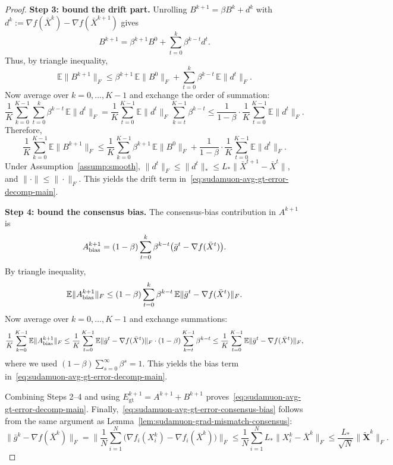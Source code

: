 \documentclass{article}
\begin{document}
\begin{proof}
\medskip\noindent\textbf{Step 3: bound the drift part.}
Unrolling $B^{k+1}=\beta B^k+d^k$ with $d^k:=\nabla f(\bar X^k)-\nabla f(\bar X^{k+1})$ gives
\[
B^{k+1}=\beta^{k+1}B^0+\sum_{t=0}^{k}\beta^{k-t}d^t.
\]
Thus, by triangle inequality,
\[
\mathbb{E}\|B^{k+1}\|_F
\le \beta^{k+1}\,\mathbb{E}\|B^0\|_F
+\sum_{t=0}^{k}\beta^{k-t}\,\mathbb{E}\|d^t\|_F.
\]
Now average over $k=0,\dots,K-1$ and exchange the order of summation:
\[
\frac{1}{K}\sum_{k=0}^{K-1}\sum_{t=0}^{k}\beta^{k-t}\,\mathbb{E}\|d^t\|_F
=\frac{1}{K}\sum_{t=0}^{K-1}\mathbb{E}\|d^t\|_F\sum_{k=t}^{K-1}\beta^{k-t}
\le \frac{1}{1-\beta}\cdot \frac{1}{K}\sum_{t=0}^{K-1}\mathbb{E}\|d^t\|_F.
\]
Therefore,
\[
\frac{1}{K}\sum_{k=0}^{K-1}\mathbb{E}\|B^{k+1}\|_F
\le \frac{1}{K}\sum_{k=0}^{K-1}\beta^{k+1}\,\mathbb{E}\|B^0\|_F
+\frac{1}{1-\beta}\cdot \frac{1}{K}\sum_{t=0}^{K-1}\mathbb{E}\|d^t\|_F.
\]
Under Assumption~\ref{assump:smooth},
$\|d^t\|_F\le \|d^t\|_*\le L_*\|\bar X^{t+1}-\bar X^t\|$, and $\|\cdot\|\le \|\cdot\|_F$.
This yields the drift term in~\eqref{eq:sudamuon-avg-gt-error-decomp-main}.

\medskip\noindent\textbf{Step 4: bound the consensus bias.}
The consensus-bias contribution in $A^{k+1}$ is
\[
A_{\rm bias}^{k+1}=(1-\beta)\sum_{t=0}^{k}\beta^{k-t}\bigl(\bar g^t-\nabla f(\bar X^t)\bigr).
\]
By triangle inequality,
\[
\mathbb{E}\|A_{\rm bias}^{k+1}\|_F
\le (1-\beta)\sum_{t=0}^{k}\beta^{k-t}\,\mathbb{E}\|\bar g^t-\nabla f(\bar X^t)\|_F.
\]
Now average over $k=0,\dots,K-1$ and exchange summations:
\[
\frac{1}{K}\sum_{k=0}^{K-1}\mathbb{E}\|A_{\rm bias}^{k+1}\|_F
\le \frac{1}{K}\sum_{t=0}^{K-1}\mathbb{E}\|\bar g^t-\nabla f(\bar X^t)\|_F\cdot (1-\beta)\sum_{k=t}^{K-1}\beta^{k-t}
\le \frac{1}{K}\sum_{t=0}^{K-1}\mathbb{E}\|\bar g^t-\nabla f(\bar X^t)\|_F,
\]
where we used $(1-\beta)\sum_{s=0}^{\infty}\beta^s=1$.
This yields the bias term in~\eqref{eq:sudamuon-avg-gt-error-decomp-main}.

Combining Steps 2--4 and using $E_{\mathrm{gt}}^{k+1}=A^{k+1}+B^{k+1}$ proves~\eqref{eq:sudamuon-avg-gt-error-decomp-main}.
Finally,~\eqref{eq:sudamuon-avg-gt-error-consensus-bias} follows from the same argument as Lemma~\ref{lem:sudamuon-grad-mismatch-consensus}:
\[
\|\bar g^k-\nabla f(\bar X^k)\|_F
=\Big\|\frac{1}{N}\sum_{i=1}^N\bigl(\nabla f_i(X_i^k)-\nabla f_i(\bar X^k)\bigr)\Big\|_F
\le \frac{1}{N}\sum_{i=1}^N L_*\|X_i^k-\bar X^k\|_F
\le \frac{L_*}{\sqrt N}\|\tilde{\mathbf X}^k\|_F.
\]
\end{proof}
\end{document}
